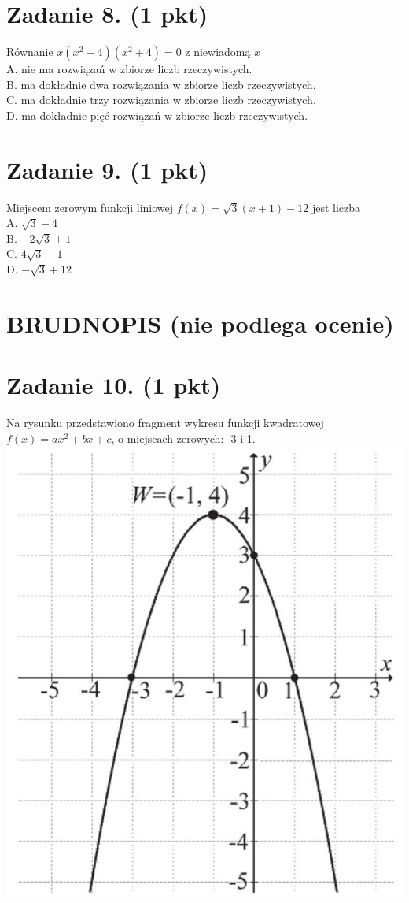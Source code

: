 \documentclass[10pt]{article}
\begin{document}
\section*{Zadanie 8. (1 pkt)}
Równanie \(x\left(x^{2}-4\right)\left(x^{2}+4\right)=0\) z niewiadomą \(x\)\\
A. nie ma rozwiązań w zbiorze liczb rzeczywistych.\\
B. ma dokładnie dwa rozwiązania w zbiorze liczb rzeczywistych.\\
C. ma dokładnie trzy rozwiązania w zbiorze liczb rzeczywistych.\\
D. ma dokładnie pięć rozwiązań w zbiorze liczb rzeczywistych.

\section*{Zadanie 9. (1 pkt)}
Miejscem zerowym funkcji liniowej \(f(x)=\sqrt{3}(x+1)-12\) jest liczba\\
A. \(\sqrt{3}-4\)\\
B. \(-2 \sqrt{3}+1\)\\
C. \(4 \sqrt{3}-1\)\\
D. \(-\sqrt{3}+12\)

\section*{BRUDNOPIS (nie podlega ocenie)}
\section*{Zadanie 10. (1 pkt)}
Na rysunku przedstawiono fragment wykresu funkcji kwadratowej \(f(x)=a x^{2}+b x+c\), o miejscach zerowych: -3 i 1.\\
\includegraphics[max width=\textwidth, center]{2024_11_21_ad8c43efe74fa059d24eg-06}
\end{document}
